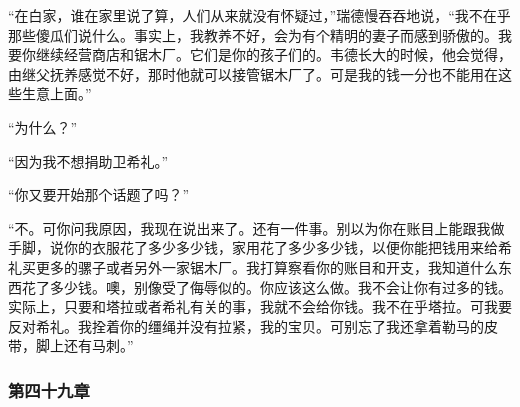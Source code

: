 \par “在白家，谁在家里说了算，人们从来就没有怀疑过，”瑞德慢吞吞地说，“我不在乎那些傻瓜们说什么。事实上，我教养不好，会为有个精明的妻子而感到骄傲的。我要你继续经营商店和锯木厂。它们是你的孩子们的。韦德长大的时候，他会觉得，由继父抚养感觉不好，那时他就可以接管锯木厂了。可是我的钱一分也不能用在这些生意上面。”
\par “为什么？”
\par “因为我不想捐助卫希礼。”
\par “你又要开始那个话题了吗？”
\par “不。可你问我原因，我现在说出来了。还有一件事。别以为你在账目上能跟我做手脚，说你的衣服花了多少多少钱，家用花了多少多少钱，以便你能把钱用来给希礼买更多的骡子或者另外一家锯木厂。我打算察看你的账目和开支，我知道什么东西花了多少钱。噢，别像受了侮辱似的。你应该这么做。我不会让你有过多的钱。实际上，只要和塔拉或者希礼有关的事，我就不会给你钱。我不在乎塔拉。可我要反对希礼。我拴着你的缰绳并没有拉紧，我的宝贝。可别忘了我还拿着勒马的皮带，脚上还有马刺。”

\subsubsection{第四十九章}


